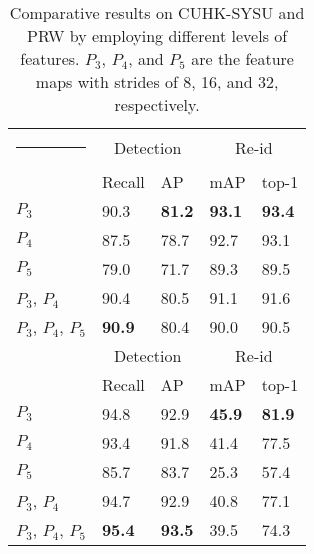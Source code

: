 \documentclass[journal]{IEEEtran}
\makeatletter
\newcommand{\thickhline}{\noalign {\ifnum 0=`}\fi \hrule height 1pt
    \futurelet \reserved@a \@xhline
}
\makeatother
\begin{document}
\begin{table}[ht]
\small
\centering
\begin{tabular}{p{2cm}|p{1.1cm}<{\centering}p{1.1cm}<{\centering}|p{1.1cm}<{\centering}p{1.1cm}<{\centering}}
\hline\thickhline
\rowcolor{mygray} 
  & \multicolumn{2}{c|}{Detection} & \multicolumn{2}{c}{Re-id}   \\ \cline{2-5} 
\rowcolor{mygray} 
\multirow{-2}{*}{CUKH-SYSU}  & Recall & AP  & mAP  & top-1  \\  \hline \hline     
$P_3$
  & 90.3    & \textbf{81.2} &\textbf{93.1} & \textbf{93.4}  \\
$P_4$  & 87.5   & 78.7       & 92.7   & 93.1    \\ 
$P_5$  & 79.0   & 71.7       & 89.3   & 89.5  \\
$P_3$, $P_4$  & 90.4  & 80.5       & 91.1 & 91.6 \\ 
$P_3$, $P_4$, $P_5$  & \textbf{90.9}  & 80.4       & 90.0 & 90.5 \\\hline \hline
\rowcolor{mygray} 
  & \multicolumn{2}{c|}{Detection} & \multicolumn{2}{c}{Re-id}   \\ \cline{2-5} 
\rowcolor{mygray} 
\multirow{-2}{*}{PRW}  & Recall & AP  & mAP  & top-1  \\  \hline \hline     
$P_3$
  &  94.8   & 92.9  &\textbf{45.9} & \textbf{81.9}  \\
$P_4$  &   93.4  &  91.8      & 41.4   & 77.5    \\ 
$P_5$  &  85.7  &    83.7    & 25.3  & 57.4  \\
$P_3$, $P_4$  & 94.7 & 92.9      & 40.8 & 77.1 \\ 
$P_3$, $P_4$, $P_5$  &  \textbf{95.4}  &    \textbf{93.5}  & 39.5 & 74.3 \\\hline
\end{tabular}
\caption{Comparative results on CUHK-SYSU and PRW by employing different levels of features. $P_3$, $P_4$, and $P_5$ are the feature maps with strides of 8, 16, and 32, respectively. }
\label{tab:scale}
\end{table}
\end{document}
